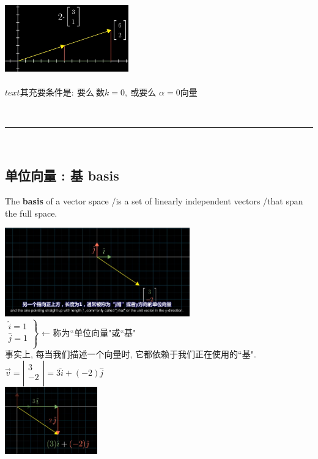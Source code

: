 \documentclass[UTF8]{ctexart}
\begin{document}
\includegraphics[width=0.4\textwidth]{img/0067.png}\\
\\


$text{其充要条件是:\ 要么\ 数}k=0,\ \text{或要么\ }\alpha =0\text{向量}$


~\\
\hrule
~\\


\subsection{单位向量 : 基 basis}

The \textbf{basis} of a vector space /is a set of linearly independent vectors /that span the full space.

\includegraphics[width=0.6\textwidth]{img/0068.png}\\

$\left. \begin{array}{r}
		\hat{i} = 1 \\
		\hat{j} = 1 \\
	\end{array} \right\}$ ← 称为``单位向量"或``基"\\

事实上, 每当我们描述一个向量时, 它都依赖于我们正在使用的``基".\\

$\vec{v}=\left| \begin{array}{l}
		3  \\
		-2 \\
	\end{array} \right|= 3 \hat{i} + (-2)\hat{j}$\\

\includegraphics[width=0.3\textwidth]{img/0069.png}\\
\end{document}
